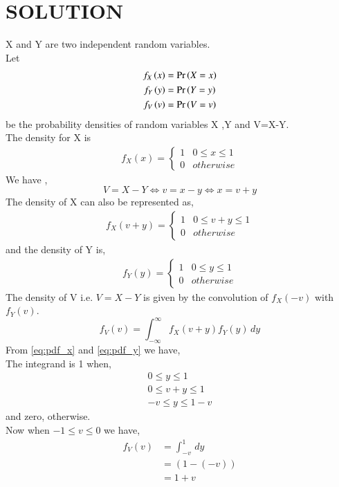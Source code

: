 \documentclass[journal,12pt,twocolumn]{IEEEtran}
\begin{document}
\section{SOLUTION}
X and Y are two independent random variables. \\
Let
\begin{align}
    f_X\left(x\right) &= \Pr\left(X=x\right) \\
    f_Y\left(y\right) &= \Pr\left(Y=y\right)  \\
    f_V\left(v\right) &= \Pr\left(V=v\right)
\end{align}
be the probability densities of random variables X ,Y and V=X-Y.\\
The density for X is \\
\begin{align}
\label{eq:_pdf_x}
f_{X}(x)  = 
\begin{cases}
1 & 0 \le x \le 1
\\
0 & otherwise
\end{cases}
\end{align}
We have ,
\begin{equation}
    V= X-Y \iff v= x- y \iff x = v+y
\end{equation}
The density of X can also be represented as,
\begin{align}
\label{eq:pdf_x}
f_{X}(v+y)  = 
\begin{cases}
1 & 0 \le v+y \le 1
\\
0 & otherwise
\end{cases}
\end{align}
and the density of Y is,
\begin{align}
\label{eq:pdf_y}
f_{Y}(y)  = 
\begin{cases}
1 & 0 \le y \le 1
\\
0 & otherwise
\end{cases}
\end{align}
The density of V i.e. $V=X-Y $ is given by the convolution of $f_X(-v)$ with $f_Y(v)$.
\begin{equation}
    f_V(v) =  \int_{- \infty}^{\infty} f_X(v+y)f_Y(y) \,dy 
\end{equation}
From \ref{eq:pdf_x} and \ref{eq:pdf_y} we have, \\
The integrand is 1 when,
\begin{align}
    0 \le y \le 1 \\
    0 \le v+y \le 1 \\
    -v \le y \le 1-v
\end{align}
and zero, otherwise. \\
Now when $-1 \le v \le 0$ we have, 
\begin{align}
    f_V(v) &=   \int_{-v}^{1} \,dy  \\
          &= (1 - (-v)) \\
          &= 1+v
\end{align}
\end{document}
